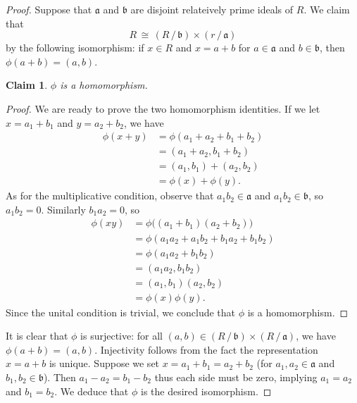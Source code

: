 \documentclass[11pt]{article}
\newtheorem{claim}{Claim}
\begin{document}
\begin{proof}
  Suppose that $\mathfrak{a}$ and $\mathfrak{b}$ are disjoint relateively prime ideals of $R$. We claim that
  \[
    R \, \cong \, (R \, / \, \mathfrak{b}) \times (r \, / \, \mathfrak{a})
  \]
  by the following isomorphism: if $x \in R$ and $x = a + b$ for $a \in \mathfrak{a}$ and $b \in \mathfrak{b}$, then $\phi(a + b) = (a, b)$.
  
  \begin{adjustwidth}{1cm}{}
    \begin{claim}
      $\phi$ is a homomorphism.
    \end{claim}
    \begin{proof}\renewcommand{\qedsymbol}{}
  
    We are ready to prove the two homomorphism identities. If we let $x = a_{1} + b_{1}$ and $y = a_{2} + b_{2}$, we have
    \begin{align*}
      \phi(x + y) &= \phi(a_{1} + a_{2} + b_{1} + b_{2}) \\
                  &= (a_{1} + a_{2}, b_{1} + b_{2}) \\
                  &= (a_{1}, b_{1}) + (a_{2}, b_{2}) \\
                  &= \phi(x) + \phi(y).
    \end{align*}
    As for the multiplicative condition, observe that $a_{1}b_{2} \in \mathfrak{a}$ and $a_{1}b_{2} \in \mathfrak{b}$, so $a_{1}b_{2} = 0$. Similarly $b_{1}a_{2} = 0$, so
    \begin{align*}
      \phi(xy) &= \phi \big( (a_{1} + b_{1})(a_{2} + b_{2}) \big) \\
               &= \phi(a_{1}a_{2} + a_{1}b_{2} + b_{1}a_{2} + b_{1}b_{2}) \\
               &= \phi(a_{1}a_{2} + b_{1}b_{2}) \\
               &= (a_{1}a_{2}, b_{1}b_{2}) \\
               &= (a_{1}, b_{1})(a_{2}, b_{2}) \\
               &= \phi(x) \phi(y).
    \end{align*}
    Since the unital condition is trivial, we conclude that $\phi$ is a homomorphism.
    \end{proof}
  \end{adjustwidth}
  
  It is clear that $\phi$ is surjective: for all $(a, b) \in (R \, / \, \mathfrak{b}) \times (R \, / \, \mathfrak{a})$, we have $\phi(a + b) = (a, b)$. Injectivity follows from the fact the representation $x = a + b$ is unique. Suppose we set $x = a_{1} + b_{1} = a_{2} + b_{2}$ (for $a_{1}, a_{2} \in \mathfrak{a}$ and $b_{1}, b_{2} \in \mathfrak{b}$).  Then $a_{1} - a_{2} = b_{1} - b_{2}$ thus each side must be zero, implying $a_{1} = a_{2}$ and $b_{1} = b_{2}$. We deduce that $\phi$ is the desired isomorphism.
\end{proof}
\end{document}
